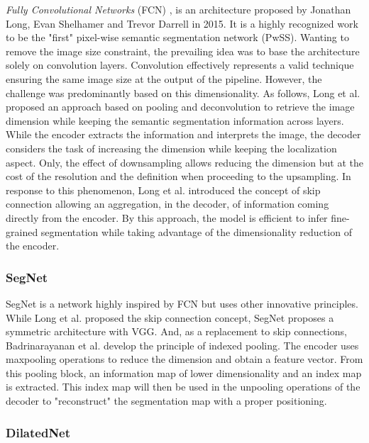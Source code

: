 \emph{Fully Convolutional Networks} (FCN) \cite{long2015fully}, is an architecture proposed by Jonathan Long, Evan Shelhamer and Trevor Darrell in 2015. It is a highly recognized work to be the "first" pixel-wise semantic segmentation network (PwSS). Wanting to remove the image size constraint, the prevailing idea was to base the architecture solely on convolution layers. Convolution effectively represents a valid technique ensuring the same image size at the output of the pipeline. 
However, the challenge was predominantly based on this dimensionality. As follows, Long et al. proposed an approach based on pooling and deconvolution to retrieve the image dimension while keeping the semantic segmentation information across layers.
While the encoder extracts the information and interprets the image, the decoder considers the task of increasing the dimension while keeping the localization aspect. Only, the effect of downsampling allows reducing the dimension but at the cost of the resolution and the definition when proceeding to the upsampling. In response to this phenomenon, Long et al. introduced the concept of skip connection allowing an aggregation, in the decoder, of information coming directly from the encoder. By this approach, the model is efficient to infer fine-grained segmentation while taking advantage of the dimensionality reduction of the encoder.


\subsubsection{SegNet}

SegNet \cite{DBLP:journals/corr/BadrinarayananH15} is a network highly inspired by FCN but uses other innovative principles. While Long et al. proposed the skip connection concept, SegNet proposes a symmetric architecture with VGG.
And, as a replacement to skip connections, Badrinarayanan et al. develop the principle of indexed pooling. The encoder uses maxpooling operations to reduce the dimension and obtain a feature vector. From this pooling block, an information map of lower dimensionality and an index map is extracted. This index map will then be used in the unpooling operations of the decoder to "reconstruct" the segmentation map with a proper positioning. 



\subsubsection{DilatedNet}

